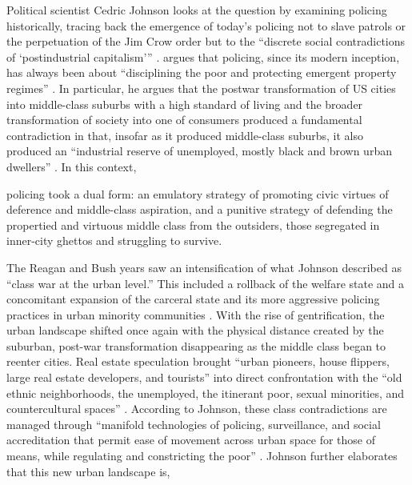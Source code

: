 \documentclass[12pt]{article}
\renewenvironment{quote}
  {\list{}{\leftmargin=\parindent\rightmargin=0pt}%
   \item\relax}
  {\endlist}
\begin{document}

Political scientist Cedric Johnson looks at the question by examining policing historically, tracing back the emergence of today’s policing not to slave patrols or the perpetuation of the Jim Crow order but to the “discrete social contradictions of ‘postindustrial capitalism’” \parencite*[171]{johnsonTrumpismPolicingProblem2019}. \citeauthor{johnsonTrumpismPolicingProblem2019} argues that policing, since its modern inception, has always been about “disciplining the poor and protecting emergent property regimes” \parencite*[172]{johnsonTrumpismPolicingProblem2019}. In particular, he argues that the postwar transformation of US cities into middle-class suburbs with a high standard of living and the broader transformation of society into one of consumers produced a fundamental contradiction in that, insofar as it produced middle-class suburbs, it also produced an “industrial reserve of unemployed, mostly black and brown urban dwellers” \parencite*[171]{johnsonTrumpismPolicingProblem2019}. In this context,

\begin{quote}
policing took a dual form: an emulatory strategy of promoting civic virtues of deference and middle-class aspiration, and a punitive strategy of defending the propertied and virtuous middle class from the outsiders, those segregated in inner-city ghettos and struggling to survive. \parencite[176]{johnsonTrumpismPolicingProblem2019}
\end{quote}

The Reagan and Bush years saw an intensification of what Johnson described as “class war at the urban level.” This included a rollback of the welfare state and a concomitant expansion of the carceral state and its more aggressive policing practices in urban minority communities \parencites[177]{johnsonTrumpismPolicingProblem2019}{johnsonBlackLivesMatter2023}. With the rise of gentrification, the urban landscape shifted once again with the physical distance created by the suburban, post-war transformation disappearing as the middle class began to reenter cities. Real estate speculation brought “urban pioneers, house flippers, large real estate developers, and tourists” into direct confrontation with the “old ethnic neighborhoods, the unemployed, the itinerant poor, sexual minorities, and countercultural spaces” \parencite[177]{johnsonTrumpismPolicingProblem2019}. According to Johnson, these class contradictions are managed through “manifold technologies of policing, surveillance, and social accreditation that permit ease of movement across urban space for those of means, while regulating and constricting the poor” \parencite*[178]{johnsonTrumpismPolicingProblem2019}. Johnson further elaborates that this new urban landscape is,
\end{document}
